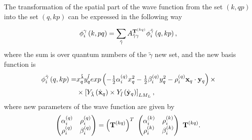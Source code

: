 \documentclass[
12pt, %
oneside, %
english, %
onehalfspacing, %
onehalfspacing, %
headsepline, %
]{MastersDoctoralThesis} %
\begin{document}

The transformation of the spatial part of the wave function from the set $ \left(k, qp \right) $ into the set $ \left(q, kp \right) $ can be expressed in the following way \cite{suzuki1998stochastic, kukulin1990dynamic}

  \begin{equation}
 \label{transformbasisfunction}
 \phi_{i}^{\gamma}\left(k, pq \right) = \sum_{\tilde{\gamma}} A_{\tilde{\gamma}\gamma}^{{\bf T}^{(kq)} }
  \phi_{i}^{\tilde{\gamma} } \left(q, kp \right) ,
 \end{equation}
where the sum is over quantum numbers of the $ \tilde {\gamma} $ new set, and the new basis function is
\begin{align}
\phi_{i}^{\tilde{\gamma} } \left(q, kp \right)  =  &
 x_{q}^{\tilde{\lambda}} y_{q}^{\tilde{l}} exp\left(- \tfrac{1}{2} \alpha^{(q)}_{i} x_{q}^{2} - \tfrac{1}{2} \beta^{(q)}_{i}  y_{q}^{2} - \rho^{(q)}_i {\bf x}_{q} \cdot {\bf y}_{q}  \right) 
\times  \nonumber \\ 
&\times  \left[ Y_{\tilde{\lambda}} \left(  \hat{ \bf x}_q \right) \times Y_{\tilde{l}} \left( \hat{\bf y}_q \right) \right]_{LM_L},
\label{newBasis}
\end{align}
where new parameters of the wave function are given by
\begin{align}
\begin{pmatrix}
\alpha_i^{(q)} & \rho_i^{(q)} \\ 
\rho_i^{(q)} & \beta_i^{(q)}
\end{pmatrix}  = \left( {\bf T}^{(kq)} \right)^{T}  ~
\begin{pmatrix}
\alpha_i^{(k)} & \rho_i^{(k)} \\ 
\rho_i^{(k)} & \beta_i^{(k)}
\end{pmatrix} ~  {\bf T}^{(kq)}.
\end{align}
\end{document}
